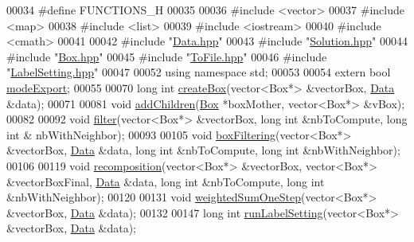 \begin{DoxyCode}
00034 \textcolor{preprocessor}{}\textcolor{preprocessor}{#define FUNCTIONS\_H}
00035 \textcolor{preprocessor}{}
00036 \textcolor{preprocessor}{#include <vector>}
00037 \textcolor{preprocessor}{#include <map>}
00038 \textcolor{preprocessor}{#include <list>}
00039 \textcolor{preprocessor}{#include <iostream>}
00040 \textcolor{preprocessor}{#include <cmath>}
00041 
00042 \textcolor{preprocessor}{#include "\hyperlink{Data_8hpp}{Data.hpp}"}
00043 \textcolor{preprocessor}{#include "\hyperlink{Solution_8hpp}{Solution.hpp}"}
00044 \textcolor{preprocessor}{#include "\hyperlink{Box_8hpp}{Box.hpp}"}
00045 \textcolor{preprocessor}{#include "\hyperlink{ToFile_8hpp}{ToFile.hpp}"}
00046 \textcolor{preprocessor}{#include "\hyperlink{LabelSetting_8hpp}{LabelSetting.hpp}"}
00047 
00052 \textcolor{keyword}{using namespace }std;
00053 
00054 \textcolor{keyword}{extern} \textcolor{keywordtype}{bool} \hyperlink{group__global_gaa1e2a21621a42fc9b5bfe20792f549cf}{modeExport};
00055 
00070 \textcolor{keywordtype}{long} \textcolor{keywordtype}{int} \hyperlink{group__paving_gad7ff18ff688b5a8a49f24a645f0ac81b}{createBox}(vector<Box*> &vectorBox, \hyperlink{classData}{Data} &data);
00071 
00081 \textcolor{keywordtype}{void} \hyperlink{group__paving_ga817e709f0dfe009173e620d7c7351cb0}{addChildren}(\hyperlink{classBox}{Box} *boxMother, vector<Box*> &vBox);
00082 
00092 \textcolor{keywordtype}{void} \hyperlink{group__paving_gaec5b916ee7df8d19aa1b7a8f890afd0c}{filter}(vector<Box*> &vectorBox, \textcolor{keywordtype}{long} \textcolor{keywordtype}{int} &nbToCompute, \textcolor{keywordtype}{long} \textcolor{keywordtype}{int} &
      nbWithNeighbor);
00093 
00105 \textcolor{keywordtype}{void} \hyperlink{group__paving_ga9993202ec3ae8b54b44225efaed1a094}{boxFiltering}(vector<Box*> &vectorBox, \hyperlink{classData}{Data} &data, \textcolor{keywordtype}{long} \textcolor{keywordtype}{int} &nbToCompute, \textcolor{keywordtype}{
      long} \textcolor{keywordtype}{int} &nbWithNeighbor);
00106 
00119 \textcolor{keywordtype}{void} \hyperlink{group__paving_gae586beeb3e3b560dbe75b5aa3b4e6745}{recomposition}(vector<Box*> &vectorBox, vector<Box*> &vectorBoxFinal, \hyperlink{classData}{Data} 
      &data, \textcolor{keywordtype}{long} \textcolor{keywordtype}{int} &nbToCompute, \textcolor{keywordtype}{long} \textcolor{keywordtype}{int} &nbWithNeighbor);
00120 
00131 \textcolor{keywordtype}{void} \hyperlink{group__paving_gafdfff519e5ecb3b23fe9e588b3f0c639}{weightedSumOneStep}(vector<Box*> &vectorBox, \hyperlink{classData}{Data} &data);
00132 
00147 \textcolor{keywordtype}{long} \textcolor{keywordtype}{int} \hyperlink{group__generating_ga6a6fb7581f6d456fd632d435e72babef}{runLabelSetting}(vector<Box*> &vectorBox, \hyperlink{classData}{Data} &data);

\end{DoxyCode}

